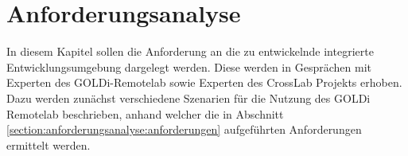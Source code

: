 \chapter{Anforderungsanalyse}\label{section:anforderungsanalyse}

In diesem Kapitel sollen die Anforderung an die zu entwickelnde integrierte Entwicklungsumgebung dargelegt werden. Diese werden in Gesprächen mit Experten des GOLDi-Remotelab sowie Experten des CrossLab Projekts erhoben. Dazu werden zunächst verschiedene Szenarien für die Nutzung des GOLDi Remotelab beschrieben, anhand welcher die in Abschnitt \ref{section:anforderungsanalyse:anforderungen} aufgeführten Anforderungen ermittelt werden.




